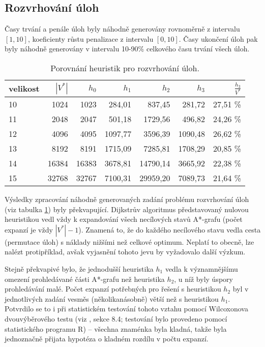 \documentclass[12pt,notitlepage,fleqn]{report} %
\theoremstyle{definition}
\begin{document}
\subsection{Rozvrhování úloh}
Časy trvání a penále úloh byly náhodně generovány rovnoměrně z intervalu  $[1,10]$, koeficienty růstu penalizace z intervalu  $[0,10]$. Časy ukončení úloh pak byly náhodně generovány v intervalu 10-90\% celkového času trvání všech úloh.
\begin{table}[h]
\label{tab-heur-ru}
\begin{center}
\begin{tabular}{l|rrrrrr}
velikost & $|V^*|$ & $h_0$ & $h_1$ & $h_2$ & $h_3$ & $\frac{h_3}{V^*}$ \\ \hline 
10&1024 &1023 &284,01 &837,45  &281,72  &27,51 \%\\
11&2048 &2047 &501,18 &1729,56 &496,82  &24,26 \%\\
12&4096 &4095 &1097,77&3596,39 &1090,48 &26,62 \%\\
13&8192 &8191 &1715,09&7285,81 &1708,29 &20,85 \%\\
14&16384&16383&3678,81&14790,14&3665,92 &22,38 \%\\
15&32768&32767&7100,31&29959,20 &7089,73 &21,64 \%
\end{tabular}
\end{center}
\caption{Porovnání heuristik pro rozvrhování úloh.}
\end{table}
Výsledky zpracování náhodně generovaných zadání problému rozvrhování úloh (viz tabulka \ref{tab-heur-ru}) byly překvapující. Dijkstrův algoritmus představovaný nulovou heuristikou vedl vždy k expandování všech necílových stavů A*-grafu (počet expanzí je vždy $|V^*|-1$). Znamená to, že do každého necílového stavu vedla cesta (permutace úloh) s náklady nižšími než celkové optimum. Neplatí to obecně, lze nalézt protipříklad, avšak vyjasnění tohoto jevu by vyžadovalo další výzkum.

Stejně překvapivé bylo, že jednodušší heuristika $h_1$ vedla k významnějšímu omezení prohledávané části A*-grafu než heuristika $h_2$, u níž byly úspory prohledávání malé. Počet expanzí potřebných pro řešení s heuristikou $h_2$ byl v jednotlivých zadání vesměs (několikanásobně) větší než s heuristikou $h_1$. Potvrdilo se to i při statistickém testování tohoto vztahu pomocí Wilcoxonova dvouvýběrového testu (viz \cite{andel}, sekce 8.4; testování bylo provedeno pomocí statistického programu R) -- všechna znaménka byla kladná, takže byla jednoznačně přijata hypotéza o kladném rozdílu v počtu expanzí.
\end{document}
